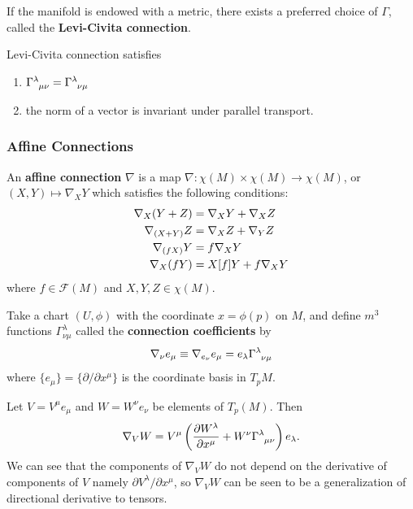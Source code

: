 \documentclass[10pt]{article}
\begin{document}
If the manifold is endowed with a metric, there exists a preferred choice of $\Gamma$, called the \textbf{Levi-Civita connection}.
\begin{property}
    Levi-Civita connection satisfies
    \begin{enumerate}
        \item $\tensor{\Gamma}{^{\lambda}_{\mu\nu}} = \tensor{\Gamma}{^{\lambda}_{\nu\mu}}$
        \item the norm of a vector is invariant under parallel transport.
    \end{enumerate}
\end{property}
\subsubsection{Affine Connections}
\begin{definition}
    An \textbf{affine connection} $\nabla$ is a map $\nabla: \chi(M)\times\chi(M)\to\chi(M)$, or $(X,Y)\mapsto\nabla_X Y$ which satisfies the following conditions:
    \begin{align}
        \nabla_X(Y+Z)   & =\nabla_X Y+\nabla_X Z  \\
        \nabla_{(X+Y)}Z & =\nabla_{X}Z+\nabla_Y Z \\
        \nabla_{(fX)}Y  & =f\nabla_{X}Y\notag     \\
        \nabla_X (fY)   & =X[f]Y+f\nabla_X Y
    \end{align}
    where $f\in\mathcal{F}(M)$ and $X,Y,Z\in\chi(M)$.
\end{definition}

Take a chart $(U,\phi)$ with the coordinate $x=\phi(p)$ on $M$, and define $m^3$ functions $\Gamma_{\nu\mu}^{\lambda}$ called the \textbf{connection coefficients} by
\begin{align}
    \nabla_\nu e_\mu\equiv\nabla_{e_\nu}e_\mu=e_\lambda\tensor{\Gamma}{^{\lambda}_{\nu\mu}}
\end{align}
where $\{e_\mu\}=\{\partial/\partial x^\mu\}$ is the coordinate basis in $T_p M$.

Let $V=V^\mu e_\mu$ and $W=W^\nu e_\nu$ be elements of $T_p(M)$.
Then
\begin{align}
    \nabla_V W=V^\mu\left(\frac{\partial W^\lambda}{\partial x^\mu}+W^\nu \tensor{\Gamma}{^\lambda_{\mu\nu}}\right)e_\lambda.
\end{align}
We can see that the components of $\nabla_VW$ do not depend on the derivative of components of $V$ namely $\partial V^\lambda/\partial x^\mu$, so $\nabla_V W$ can be seen to be a generalization of directional derivative to tensors.
\end{document}
